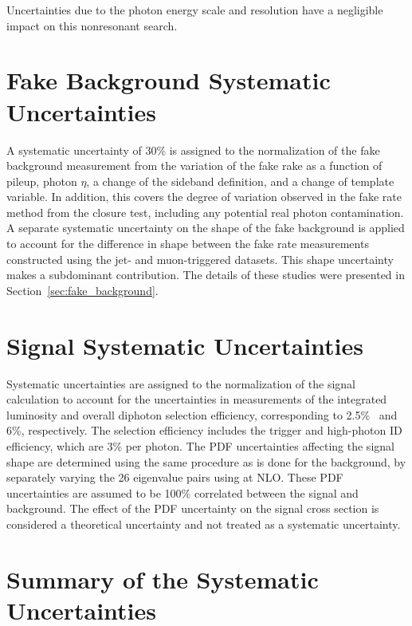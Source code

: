 Uncertainties due to the photon energy scale and resolution have a negligible impact on this nonresonant search.


\section{Fake Background Systematic Uncertainties}

A systematic uncertainty of 30\% is assigned to the normalization of the fake background measurement from the variation of the fake rake as a function of pileup, photon $\eta$, a change of the sideband definition, and a change of template variable. In addition, this covers the degree of variation observed in the fake rate method from the closure test, including any potential real photon contamination. A separate systematic uncertainty on the shape of the fake background is applied to account for the difference in shape between the fake rate measurements constructed using the jet- and muon-triggered datasets. This shape uncertainty makes a subdominant contribution. The details of these studies were presented in Section~\ref{sec:fake_background}.


\section{Signal Systematic Uncertainties}

Systematic uncertainties are assigned to the normalization of the signal calculation to account for the uncertainties in measurements of the integrated luminosity and overall diphoton selection efficiency, corresponding to 2.5\%~\cite{CMS-PAS-LUM-17-001} and 6\%, respectively. The selection efficiency includes the trigger and high-\pt photon ID efficiency, which are 3\% per photon. The PDF uncertainties affecting the signal shape are determined using the same procedure as is done for the background, by separately varying the 26 eigenvalue pairs using \DIPHOX at NLO. These PDF uncertainties are assumed to be 100\% correlated between the signal and background. The effect of the PDF uncertainty on the signal cross section is considered a theoretical uncertainty and not treated as a systematic uncertainty.


\section{Summary of the Systematic Uncertainties}

